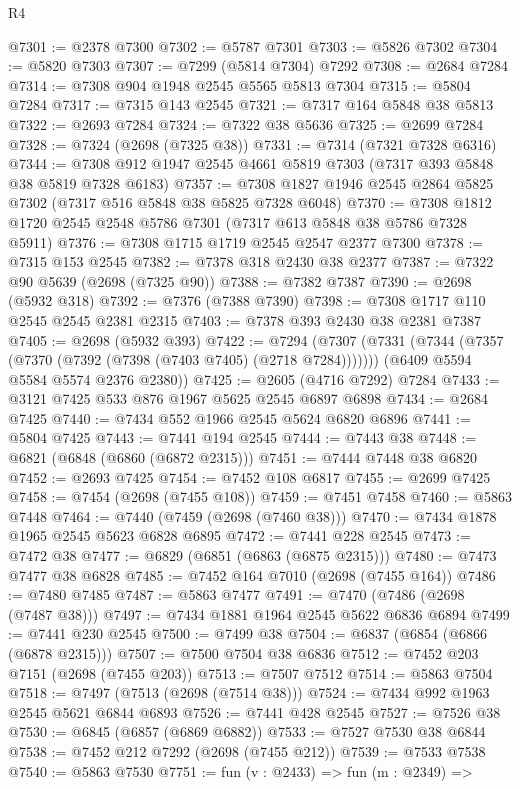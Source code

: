 \begin{lexlean}{R4}
\begin{coremodule}
@7301 := @2378 @7300
@7302 := @5787 @7301
@7303 := @5826 @7302
@7304 := @5820 @7303
@7307 := @7299 (@5814 @7304) @7292
@7308 := @2684 @7284
@7314 := @7308 @904 @1948 @2545 @5565 @5813 @7304
@7315 := @5804 @7284
@7317 := @7315 @143 @2545
@7321 := @7317 @164 @5848 @38 @5813
@7322 := @2693 @7284
@7324 := @7322 @38 @5636
@7325 := @2699 @7284
@7328 := @7324 (@2698 (@7325 @38))
@7331 := @7314 (@7321 @7328 @6316)
@7344 := @7308 @912 @1947 @2545 @4661 @5819 @7303 (@7317 @393 @5848 @38 @5819 @7328 @6183)
@7357 := @7308 @1827 @1946 @2545 @2864 @5825 @7302 (@7317 @516 @5848 @38 @5825 @7328 @6048)
@7370 := @7308 @1812 @1720 @2545 @2548 @5786 @7301 (@7317 @613 @5848 @38 @5786 @7328 @5911)
@7376 := @7308 @1715 @1719 @2545 @2547 @2377 @7300
@7378 := @7315 @153 @2545
@7382 := @7378 @318 @2430 @38 @2377
@7387 := @7322 @90 @5639 (@2698 (@7325 @90))
@7388 := @7382 @7387
@7390 := @2698 (@5932 @318)
@7392 := @7376 (@7388 @7390)
@7398 := @7308 @1717 @110 @2545 @2545 @2381 @2315
@7403 := @7378 @393 @2430 @38 @2381 @7387
@7405 := @2698 (@5932 @393)
@7422 := @7294
    (@7307
      (@7331 (@7344 (@7357 (@7370 (@7392 (@7398 (@7403 @7405) (@2718 @7284)))))))
      (@6409 @5594 @5584 @5574 @2376 @2380))
@7425 := @2605 (@4716 @7292) @7284
@7433 := @3121 @7425 @533 @876 @1967 @5625 @2545 @6897 @6898
@7434 := @2684 @7425
@7440 := @7434 @552 @1966 @2545 @5624 @6820 @6896
@7441 := @5804 @7425
@7443 := @7441 @194 @2545
@7444 := @7443 @38
@7448 := @6821 (@6848 (@6860 (@6872 @2315)))
@7451 := @7444 @7448 @38 @6820
@7452 := @2693 @7425
@7454 := @7452 @108 @6817
@7455 := @2699 @7425
@7458 := @7454 (@2698 (@7455 @108))
@7459 := @7451 @7458
@7460 := @5863 @7448
@7464 := @7440 (@7459 (@2698 (@7460 @38)))
@7470 := @7434 @1878 @1965 @2545 @5623 @6828 @6895
@7472 := @7441 @228 @2545
@7473 := @7472 @38
@7477 := @6829 (@6851 (@6863 (@6875 @2315)))
@7480 := @7473 @7477 @38 @6828
@7485 := @7452 @164 @7010 (@2698 (@7455 @164))
@7486 := @7480 @7485
@7487 := @5863 @7477
@7491 := @7470 (@7486 (@2698 (@7487 @38)))
@7497 := @7434 @1881 @1964 @2545 @5622 @6836 @6894
@7499 := @7441 @230 @2545
@7500 := @7499 @38
@7504 := @6837 (@6854 (@6866 (@6878 @2315)))
@7507 := @7500 @7504 @38 @6836
@7512 := @7452 @203 @7151 (@2698 (@7455 @203))
@7513 := @7507 @7512
@7514 := @5863 @7504
@7518 := @7497 (@7513 (@2698 (@7514 @38)))
@7524 := @7434 @992 @1963 @2545 @5621 @6844 @6893
@7526 := @7441 @428 @2545
@7527 := @7526 @38
@7530 := @6845 (@6857 (@6869 @6882))
@7533 := @7527 @7530 @38 @6844
@7538 := @7452 @212 @7292 (@2698 (@7455 @212))
@7539 := @7533 @7538
@7540 := @5863 @7530
@7751 := fun (v : @2433) =>
  fun (m : @2349) =>

\end{coremodule}
\end{lexlean}
